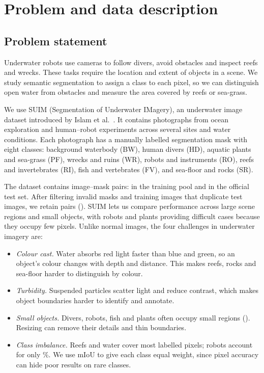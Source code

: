 \section{Problem and data description}
\label{sec:data}


\subsection{Problem statement}
\label{sec:task}
Underwater robots use cameras to follow divers, avoid obstacles and inspect
reefs and wrecks. These tasks require the location and extent of objects in a
scene. We study semantic segmentation to assign a class to each pixel, so we
can distinguish open water from obstacles and measure the area covered by
reefs or sea-grass.

\label{sec:dataset}
We use SUIM (Segmentation of Underwater IMagery), an underwater image dataset
introduced by Islam et al.\ \cite{suim,suim-data}. It contains photographs from
ocean exploration and human--robot experiments across several sites and water
conditions. Each photograph has a manually labelled segmentation mask with
eight classes: background waterbody (BW), human divers (HD), aquatic plants and
sea-grass (PF), wrecks and ruins (WR), robots and instruments (RO), reefs and
invertebrates (RI), fish and vertebrates (FV), and sea-floor and rocks (SR).

The dataset contains \suimOnDiskTotal{} image--mask pairs:
\suimTrainValOnDisk{} in the training pool and \suimTestOnDisk{} in the official
test set. After filtering invalid masks and training images that duplicate test
images, we retain \suimUsableTotal{} pairs (). SUIM lets us
compare performance across large scene regions and small objects, with robots
and plants providing difficult cases because they occupy few pixels. Unlike normal images, the four challenges in underwater imagery are:
\begin{itemize}
\item \textit{Colour cast.} Water absorbs red light faster than blue and green,
so an object's colour changes with depth and distance. This makes reefs, rocks
and sea-floor harder to distinguish by colour.
\item \textit{Turbidity.} Suspended particles scatter light and reduce contrast,
which makes object boundaries harder to identify and annotate.
\item \textit{Small objects.} Divers, robots, fish and plants often occupy small
regions (). Resizing can remove their details and thin boundaries.
\item \textit{Class imbalance.} Reefs and water cover most labelled pixels;
robots account for only \suimShareTrainValRO\%. We use mIoU to give each class
equal weight, since pixel accuracy can hide poor results on rare classes.
\end{itemize}

